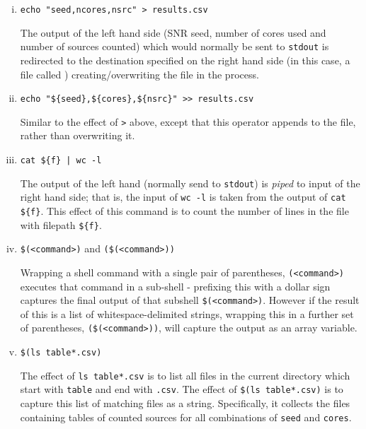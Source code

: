 \documentclass{article}
\begin{document}
\begin{enumerate}[i.]
\item
  \lstinline[otherkeywords={>}]!echo "seed,ncores,nsrc" > results.csv!

  The output of the left hand side (SNR seed, number of cores used and number of
  sources counted) which would normally be sent to \lstinline{stdout} is
  redirected to the destination specified on the right hand side (in this case,
  a file called ) creating/overwriting the file in the
  process.

\item
  \lstinline[otherkeywords={>>}]!echo "${seed},${cores},${nsrc}" >> results.csv!

  Similar to the effect of \lstinline[otherkeywords={>}]!>! above, except that
  this operator appends to the file, rather than overwriting it.

\item
  \lstinline[otherkeywords={|}]!cat ${f} | wc -l!

  The output of the left hand (normally send to \lstinline{stdout}) is
  \textit{piped} to input of the right hand side; that is, the input of
  \lstinline{wc -l} is taken from the output of \lstinline!cat ${f}!.
  This effect of this command is to count the number of lines in the file with
  filepath \lstinline!${f}!.

\item
  \lstinline!$(<command>)! and \lstinline!($(<command>))!

  Wrapping a shell command with a single pair of parentheses,
  \lstinline!(<command>)! executes that command in a sub-shell - prefixing this
  with a dollar sign captures the final output of that subshell
  \lstinline!$(<command>)!.
  However if the result of this is a list of whitespace-delimited strings,
  wrapping this in a further set of parentheses, \lstinline!($(<command>))!,
  will capture the output as an array variable.

\item
  \lstinline!$(ls table*.csv)!

  The effect of \lstinline!ls table*.csv! is to list all files in the current
  directory which start with \lstinline!table! and end with \lstinline!.csv!.
  The effect of \lstinline!$(ls table*.csv)! is to capture this list of matching
  files as a string.
  Specifically, it collects the files containing tables of counted sources for
  all combinations of \lstinline{seed} and \lstinline{cores}.


\end{enumerate}
\end{document}
